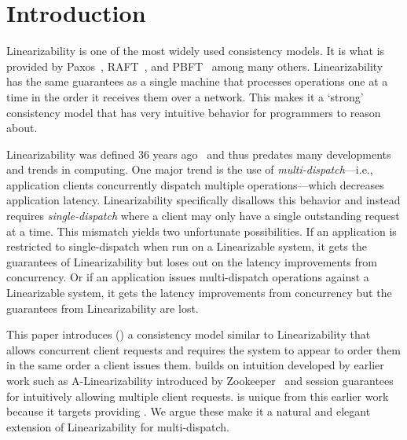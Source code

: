 \section{Introduction}
\label{sec:intro}




Linearizability is one of the most widely used consistency models.
It is what is provided by Paxos~\cite{paxos}, RAFT~\cite{raft}, and PBFT~\cite{pbft} among many others.
Linearizability has the same guarantees as a single machine that processes operations one at a time in the order it receives them over a network.
This makes it a `strong' consistency model that has very intuitive behavior for programmers to reason about.

Linearizability was defined 36 years ago~\cite{linearizability87, linearizability} and thus predates many developments and trends in computing.
One major trend is the use of \textit{multi-dispatch}---i.e., application clients concurrently dispatch multiple operations---which decreases application latency.
Linearizability specifically disallows this behavior and instead requires \textit{single-dispatch} where a client may only have a single outstanding request at a time.
This mismatch yields two unfortunate possibilities.
If an application is restricted to single-dispatch when run on a Linearizable system, it gets the guarantees of Linearizability but loses out on the latency improvements from concurrency.
Or if an application issues multi-dispatch operations against a Linearizable system, it gets the latency improvements from concurrency but the guarantees from Linearizability are lost.

This paper introduces \mdllong{} (\mdl) a consistency model similar to Linearizability that allows concurrent client requests and requires the system to appear to order them in the same order a client issues them.
\Mdl{} builds on intuition developed by earlier work such as A-Linearizability introduced by Zookeeper~\cite{a-linearizability} and session guarantees~\cite{session-guarantees} for intuitively allowing multiple client requests.
\Mdl{} is unique from this earlier work because it targets providing .
We argue these make it a natural and elegant extension of Linearizability for multi-dispatch.

